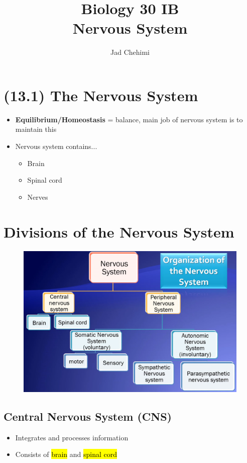 \documentclass[a4paper,12pt]{article}
\title{Biology 30 IB \\ Nervous System}
\author{Jad Chehimi}
\begin{document}
\maketitle

\tableofcontents

\pagebreak

\section{(13.1) The Nervous System}
\begin{itemize}
    \item{\textbf{Equilibrium/Homeostasis} = balance, main job of nervous system is to maintain this}
    \item{
            Nervous system contains...
            \begin{itemize}
                \item{Brain}
                \item{Spinal cord}
                \item{Nerves}
            \end{itemize}
        }
\end{itemize}

\section{Divisions of the Nervous System}
\begin{figure}[H]
    \centering
    \includegraphics[width=\textwidth]{flowchart}
\end{figure}

\subsection{Central Nervous System (CNS)}
\begin{itemize}
    \item{Integrates and processes information}
    \item{Consists of \hl{brain} and \hl{spinal cord}}
\end{itemize}
\end{document}

